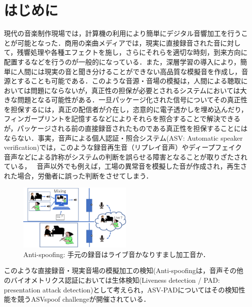 \documentclass[technicalreport]{ieicej}
\begin{document}
\section{はじめに}
現代の音楽制作現場では，計算機の利用により簡単にデジタル音響加工を行うことが可能となった．商用の楽曲メディアでは，現実に直接録音された音に対して，残響処理や各種エフェクトを施し，さらにそれらを適切な時刻，到来方向に配置するなどを行うのが一般的になっている．また，深層学習の導入により，簡単に人間には現実の音と聞き分けることができない高品質な模擬音を作成し，音源とすることも可能である．このような音源・音場の模擬は，人間による聴取においては問題にならないが，真正性の担保が必要とされるシステムにおいては大きな問題となる可能性がある．一旦パッケージ化された信号についてその真正性を担保するには，真正の配信者が介在し，恣意的に電子透かしを埋め込んだり，フィンガープリントを記憶するなどによりそれらを照合することで解決できるが，パッケージされる前の直接録音されたものである真正性を担保することにはならない．事実，音声による個人認証・照合システム(ASV: Automatic speaker verification)では，このような録音再生音（リプレイ音声）やディープフェイク音声などによる詐称がシステムの判断を誤らせる障害となることが取りざたされている，　
音声以外でも例えば，工場の異常音を模擬した音が作成され，再生された場合，労働者に誤った判断をさせてしまう．

\begin{figure}[tbh]
	\centering
	\includegraphics[width=0.5\textwidth]{fig/Anti-spoofing.png}
	\caption{Anti-spoofing: 手元の録音はライブ音かなりすまし加工音か．}
	\label{fig:Anti-Spoofing}
\end{figure}
%　　　　　　　　　　　　　　　　　　　　　　　　　　


このような直接録音・現実音場の模擬加工の検知(Anti-spoofingは，音声その他のバイオメトリクス認証においては生体検知(Liveness detection / PAD: presentation attack detection\cite{ISO/IEC30107-1:2016})として考えられ，ASV-PADについてはその検知性能を競うASVspoof challenge\cite{ASVspoof,ASVspoof2015,ASVspoof2017}が開催されている． 
\end{document}
